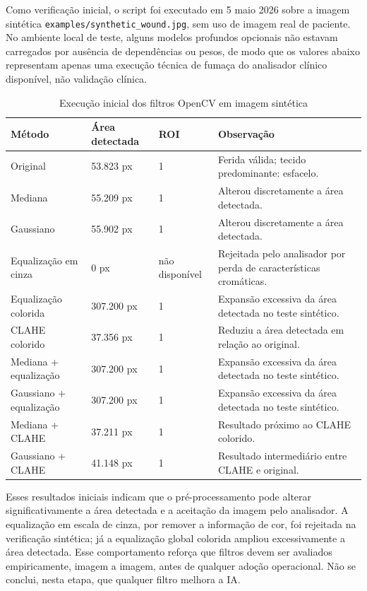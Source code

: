 \documentclass[
    12pt,
    oneside,
    a4paper,
    chapter=TITLE,
    brazil,
    sumario=tradicional,
    hidelinks
]{abntex2}
\begin{document}
Como verificação inicial, o script foi executado em 5 maio 2026 sobre a imagem sintética \texttt{examples/synthetic\_wound.jpg}, sem uso de imagem real de paciente. No ambiente local de teste, alguns modelos profundos opcionais não estavam carregados por ausência de dependências ou pesos, de modo que os valores abaixo representam apenas uma execução técnica de fumaça do analisador clínico disponível, não validação clínica.

\begin{table}[htbp]
    \centering
    \caption{\label{tab:opencv-preprocessamento}Execução inicial dos filtros OpenCV em imagem sintética}
    \begin{tabular}{L{4.0cm}C{2.6cm}C{2.1cm}L{4.0cm}}
        \toprule
        \textbf{Método} & \textbf{Área detectada} & \textbf{ROI} & \textbf{Observação} \\
        \midrule
        Original & 53.823 px & 1 & Ferida válida; tecido predominante: esfacelo. \\
        Mediana & 55.209 px & 1 & Alterou discretamente a área detectada. \\
        Gaussiano & 55.902 px & 1 & Alterou discretamente a área detectada. \\
        Equalização em cinza & 0 px & não disponível & Rejeitada pelo analisador por perda de características cromáticas. \\
        Equalização colorida & 307.200 px & 1 & Expansão excessiva da área detectada no teste sintético. \\
        CLAHE colorido & 37.356 px & 1 & Reduziu a área detectada em relação ao original. \\
        Mediana + equalização & 307.200 px & 1 & Expansão excessiva da área detectada no teste sintético. \\
        Gaussiano + equalização & 307.200 px & 1 & Expansão excessiva da área detectada no teste sintético. \\
        Mediana + CLAHE & 37.211 px & 1 & Resultado próximo ao CLAHE colorido. \\
        Gaussiano + CLAHE & 41.148 px & 1 & Resultado intermediário entre CLAHE e original. \\
        \bottomrule
    \end{tabular}
\end{table}

Esses resultados iniciais indicam que o pré-processamento pode alterar significativamente a área detectada e a aceitação da imagem pelo analisador. A equalização em escala de cinza, por remover a informação de cor, foi rejeitada na verificação sintética; já a equalização global colorida ampliou excessivamente a área detectada. Esse comportamento reforça que filtros devem ser avaliados empiricamente, imagem a imagem, antes de qualquer adoção operacional. Não se conclui, nesta etapa, que qualquer filtro melhora a IA.
\end{document}
